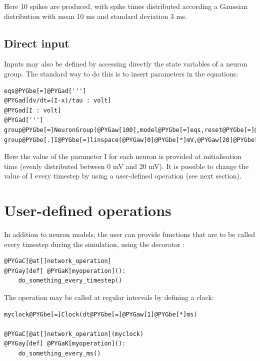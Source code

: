 \documentclass[letterpaper,10pt]{manual}
\begin{document}
Here 10 spikes are produced, with spike times distributed according a Gaussian distribution with
mean 10 ms and standard deviation 3 ms.


\subsection{Direct input}

Inputs may also be defined by accessing directly the state variables of a neuron group. The standard way
to do this is to insert parameters in the equations:

\begin{Verbatim}[commandchars=@\[\]]
eqs@PYGbe[=]@PYGad[''']
@PYGad[dv/dt=(I-x)/tau : volt]
@PYGad[I : volt]
@PYGad[''']
group@PYGbe[=]NeuronGroup(@PYGaw[100],model@PYGbe[=]eqs,reset@PYGbe[=]@PYGaw[0]@PYGbe[*]mV,threshold@PYGbe[=]@PYGaw[15]@PYGbe[*]mV)
group@PYGbe[.]I@PYGbe[=]linspace(@PYGaw[0]@PYGbe[*]mV,@PYGaw[20]@PYGbe[*]mV,@PYGaw[100])
\end{Verbatim}

Here the value of the parameter I for each neuron is provided at initialisation time
(evenly distributed between 0 mV and 20 mV).
It is possible to change the value of I every timestep by using a user-defined operation (see next
section).

\resetcurrentobjects


\section{User-defined operations}

In addition to neuron models, the user can provide functions that are to be called every timestep
during the simulation, using the decorator \hyperlink{brian.network_operation}{}:

\begin{Verbatim}[commandchars=@\[\]]
@PYGaC[@at[]network_operation]
@PYGay[def] @PYGaK[myoperation]():
    do_something_every_timestep()
\end{Verbatim}

The operation may be called at regular intervals by defining a clock:

\begin{Verbatim}[commandchars=@\[\]]
myclock@PYGbe[=]Clock(dt@PYGbe[=]@PYGaw[1]@PYGbe[*]ms)

@PYGaC[@at[]network_operation](myclock)
@PYGay[def] @PYGaK[myoperation]():
    do_something_every_ms()
\end{Verbatim}
\end{document}
